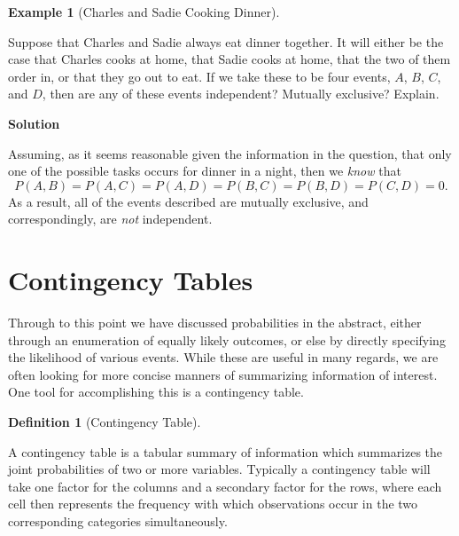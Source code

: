 \documentclass[
  letterpaper,
  DIV=11,
  numbers=noendperiod]{scrreprt}
\theoremstyle{definition}
\theoremstyle{definition}
\newtheorem{example}{Example}[chapter]
\theoremstyle{definition}
\newtheorem{definition}{Definition}[chapter]
\theoremstyle{remark}
\begin{document}
\begin{example}[Charles and Sadie Cooking
Dinner]\protect\hypertarget{exm-independence-two}{}\label{exm-independence-two}

Suppose that Charles and Sadie always eat dinner together. It will
either be the case that Charles cooks at home, that Sadie cooks at home,
that the two of them order in, or that they go out to eat. If we take
these to be four events, \(A\), \(B\), \(C\), and \(D\), then are any of
these events independent? Mutually exclusive? Explain.

\begin{tcolorbox}[enhanced jigsaw, colback=white, colframe=quarto-callout-color-frame, arc=.35mm, leftrule=.75mm, rightrule=.15mm, opacityback=0, breakable, bottomrule=.15mm, left=2mm, toprule=.15mm]

\vspace{-3mm}\textbf{Solution}\vspace{3mm}

Assuming, as it seems reasonable given the information in the question,
that only one of the possible tasks occurs for dinner in a night, then
we \emph{know} that
\[P(A,B) = P(A,C) = P(A,D) = P(B,C) = P(B,D) = P(C,D) = 0.\] As a
result, all of the events described are mutually exclusive, and
correspondingly, are \emph{not} independent.

\end{tcolorbox}

\end{example}

\section{Contingency Tables}\label{contingency-tables}

Through to this point we have discussed probabilities in the abstract,
either through an enumeration of equally likely outcomes, or else by
directly specifying the likelihood of various events. While these are
useful in many regards, we are often looking for more concise manners of
summarizing information of interest. One tool for accomplishing this is
a contingency table.

\begin{definition}[Contingency
Table]\protect\hypertarget{def-contingency-table}{}\label{def-contingency-table}

A contingency table is a tabular summary of information which summarizes
the joint probabilities of two or more variables. Typically a
contingency table will take one factor for the columns and a secondary
factor for the rows, where each cell then represents the frequency with
which observations occur in the two corresponding categories
simultaneously.

\end{definition}
\end{document}
